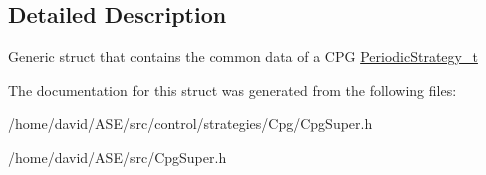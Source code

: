 \subsection{Detailed Description}
Generic struct that contains the common data of a CPG  \hyperlink{structPeriodicStrategy__t}{PeriodicStrategy\_\-t} 

The documentation for this struct was generated from the following files:\begin{CompactItemize}
\item 
/home/david/ASE/src/control/strategies/Cpg/CpgSuper.h\item 
/home/david/ASE/src/CpgSuper.h\end{CompactItemize}
